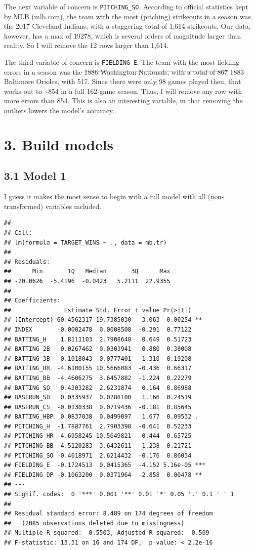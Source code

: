 \documentclass[]{article}
\begin{document}
The next variable of concern is \texttt{PITCHING\_SO}. According to
official statistics kept by MLB (mlb.com), the team with the most
(pitching) strikeouts in a season was the 2017 Cleveland Indians, with a
staggering total of 1,614 strikeouts. Our data, however, has a max of
19278, which is several orders of magnitude larger than reality. So I
will remove the 12 rows larger than 1,614.

The third variable of concern is \texttt{FIELDING\_E}. The team with the
most fielding errors in a season was the \sout{1886 Washington
Nationals, with a total of 867} 1883 Baltimore Orioles, with 517. Since
there were only 98 games played then, that works out to
\textasciitilde{}854 in a full 162-game season. Thus, I will remove any
row with more errors than 854. This is also an interesting variable, in
that removing the outliers lowers the model's accuracy.

\section{3. Build models}\label{build-models}

\subsection{3.1 Model 1}\label{model-1}

I guess it makes the most sense to begin with a full model with all
(non-transformed) variables included.

\begin{verbatim}
## 
## Call:
## lm(formula = TARGET_WINS ~ ., data = mb.tr)
## 
## Residuals:
##      Min       1Q   Median       3Q      Max 
## -20.0626  -5.4196  -0.0423   5.2111  22.9355 
## 
## Coefficients:
##               Estimate Std. Error t value Pr(>|t|)    
## (Intercept) 60.4562317 19.7385030   3.063  0.00254 ** 
## INDEX       -0.0002478  0.0008508  -0.291  0.77122    
## BATTING_H    1.8111103  2.7908648   0.649  0.51723    
## BATTING_2B   0.0267462  0.0303941   0.880  0.38008    
## BATTING_3B  -0.1018043  0.0777401  -1.310  0.19208    
## BATTING_HR  -4.6100155 10.5666083  -0.436  0.66317    
## BATTING_BB  -4.4606275  3.6457882  -1.224  0.22279    
## BATTING_SO   0.4303282  2.6231874   0.164  0.86988    
## BASERUN_SB   0.0335937  0.0288100   1.166  0.24519    
## BASERUN_CS  -0.0130338  0.0719436  -0.181  0.85645    
## BATTING_HBP  0.0837038  0.0499097   1.677  0.09532 .  
## PITCHING_H  -1.7887761  2.7903398  -0.641  0.52233    
## PITCHING_HR  4.6958245 10.5649821   0.444  0.65725    
## PITCHING_BB  4.5120283  3.6432611   1.238  0.21721    
## PITCHING_SO -0.4618971  2.6214432  -0.176  0.86034    
## FIELDING_E  -0.1724513  0.0415365  -4.152 5.16e-05 ***
## FIELDING_DP -0.1063200  0.0371964  -2.858  0.00478 ** 
## ---
## Signif. codes:  0 '***' 0.001 '**' 0.01 '*' 0.05 '.' 0.1 ' ' 1
## 
## Residual standard error: 8.489 on 174 degrees of freedom
##   (2085 observations deleted due to missingness)
## Multiple R-squared:  0.5503, Adjusted R-squared:  0.509 
## F-statistic: 13.31 on 16 and 174 DF,  p-value: < 2.2e-16
\end{verbatim}
\end{document}
